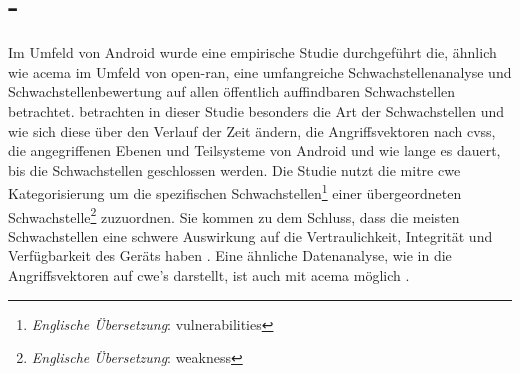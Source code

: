 %
\section{ - \citeauthor{mazuera-rozoAndroidOSStack2019}}
\label{sec:forschungsstand-android}
Im Umfeld von Android wurde eine empirische Studie durchgeführt die, ähnlich wie \gls{acema} im Umfeld von \gls{open-ran}, eine umfangreiche Schwachstellenanalyse und Schwachstellenbewertung auf allen öffentlich auffindbaren Schwachstellen betrachtet. \citeauthor{mazuera-rozoAndroidOSStack2019} betrachten in dieser Studie besonders die Art der Schwachstellen und wie sich diese über den Verlauf der Zeit ändern, die Angriffsvektoren nach \gls{cvss}, die angegriffenen Ebenen und Teilsysteme von Android und wie lange es dauert, bis die Schwachstellen geschlossen werden. Die Studie nutzt die \gls{mitre} \gls{cwe} Kategorisierung um die spezifischen Schwachstellen\footnote{\textit{Englische Übersetzung}: vulnerabilities} einer übergeordneten Schwachstelle\footnote{\textit{Englische Übersetzung}: weakness} zuzuordnen. Sie kommen zu dem Schluss, dass die meisten Schwachstellen eine schwere Auswirkung auf die Vertraulichkeit, Integrität und Verfügbarkeit des Geräts haben \autocite{mazuera-rozoAndroidOSStack2019}. Eine ähnliche Datenanalyse, wie in \cite[Abbildung 10 (a)]{mazuera-rozoAndroidOSStack2019} die Angriffsvektoren auf \gls{cwe}'s darstellt, ist auch mit \gls{acema} möglich \autocite{klementSecuring6GTransition2024}.
